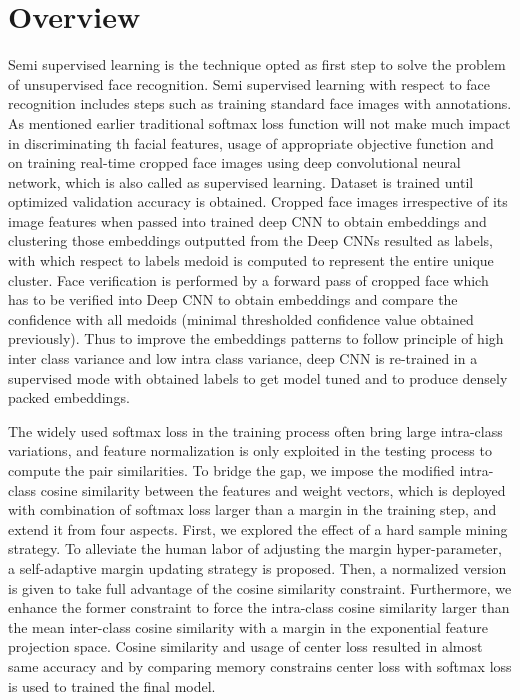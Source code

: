 \documentclass[a4paper,12pt, twoside]{NITKReport}
\begin{document}
\section{Overview}
\par Semi supervised learning is the technique opted as first step to solve the problem of unsupervised face recognition. Semi supervised learning with respect to face recognition includes steps such as training standard face images with annotations. As mentioned earlier traditional softmax loss function will not make much impact in discriminating th facial features, usage of appropriate objective function and on training real-time cropped face images using deep convolutional neural network, which is also called as supervised learning. Dataset is trained until optimized validation accuracy is obtained. Cropped face images irrespective of its image features when passed into trained deep CNN to obtain embeddings and clustering those embeddings outputted from the Deep CNNs resulted as labels, with which respect to labels medoid is computed to represent the entire unique cluster. Face verification is performed by a forward pass of cropped face which has to be verified into Deep CNN to obtain embeddings and compare the confidence with all medoids (minimal thresholded confidence value obtained previously). Thus to improve the embeddings patterns to follow principle of high inter class variance and low intra class variance, deep CNN is re-trained in a supervised mode with obtained labels to get model tuned and to produce densely packed embeddings.

\par The widely used softmax loss in the training process often bring large intra-class variations, and feature normalization is only exploited in the testing process to compute the pair similarities.  To bridge the gap, we impose the modified intra-class cosine similarity between the features and weight vectors, which is deployed with combination of softmax loss larger than a margin in the training step, and extend it from four aspects. First, we explored the effect of a hard sample mining strategy. To alleviate the human labor of adjusting the margin hyper-parameter, a self-adaptive margin updating strategy is proposed. Then, a normalized version is given to take full advantage of the cosine similarity constraint. Furthermore, we enhance the former constraint to force the intra-class cosine similarity larger than the mean inter-class cosine similarity with a margin in the exponential feature projection space. Cosine similarity and usage of center loss resulted in almost same accuracy and by comparing memory constrains center loss with softmax loss is used to trained the final model.
\end{document}
